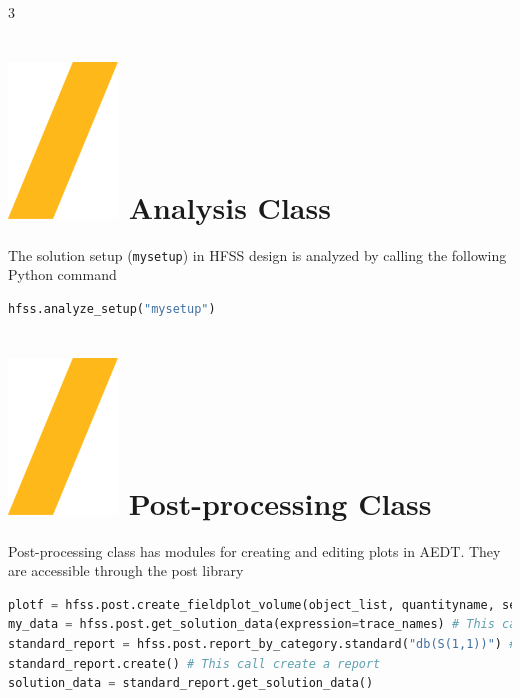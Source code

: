 \documentclass[9pt,landscape]{article}
\begin{document}
\begin{multicols}{3}
\section{\includegraphics[height=\fontcharht\font`\S]{slash.png} Analysis Class}
The solution setup (\texttt{mysetup}) in HFSS design is analyzed by calling the following Python command
\begin{lstlisting}[language=Python]
hfss.analyze_setup("mysetup")
\end{lstlisting}
\section{\includegraphics[height=\fontcharht\font`\S]{slash.png} Post-processing Class}
Post-processing class has modules for creating and editing plots in AEDT. They are accessible through the post library
\begin{lstlisting}[language=Python]
plotf = hfss.post.create_fieldplot_volume(object_list, quantityname, setup_name, intrinsic_dict) # This call returns a FieldPlot object
my_data = hfss.post.get_solution_data(expression=trace_names) # This call returns a Solution Data object
standard_report = hfss.post.report_by_category.standard("db(S(1,1))") # This call returns a new standard report object
standard_report.create() # This call create a report
solution_data = standard_report.get_solution_data()
\end{lstlisting}


\end{multicols}
\end{document}
